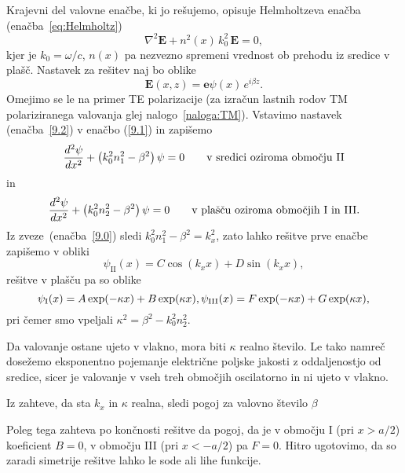 Krajevni del valovne enačbe, ki jo rešujemo, opisuje Helmholtzeva enačba 
(enačba~\ref{eq:Helmholtz})
\begin{equation}
\nabla^{2}\mathbf{E}+n^2(x)\,k_{0}^{2}\,\mathbf{E}=0,
\label{9.1}
\end{equation}
kjer je $k_{0}=\omega/c$, $n(x)$ pa nezvezno spremeni vrednost ob prehodu iz sredice v plašč. 
Nastavek za rešitev naj bo oblike 
\begin{equation}
{\mathbf E}(x,z)=\mathbf{e}\psi\left(x\right)\, e^{i\beta z}.
\label{9.2}
\end{equation}
Omejimo se le na primer TE polarizacije (za izračun lastnih rodov 
TM polariziranega
valovanja glej nalogo~\ref{naloga:TM}). Vstavimo nastavek (enačba~\ref{9.2}) v enačbo
(\ref{9.1}) in zapišemo
\begin{equation}
\frac{d^{2}{\bf \psi}}{dx^{2}}+\left(k_{0}^{2}n_1^{2}-\beta^{2}\right){\bf \psi}=0
\qquad \textrm{v sredici oziroma obmo\v cju II} 
\label{9.3a}
\end{equation}
in 
\begin{equation}
\frac{d^{2}{\bf \psi}}{dx^{2}}+\left(k_{0}^{2}n_2^{2}-\beta^{2}\right){\bf \psi}=0
\qquad \textrm{v plašču oziroma obmo\v cjih I in III.} 
\label{9.3b}
\end{equation}
Iz zveze~(enačba~\ref{9.0}) sledi $k_0^2n_1^2-\beta^2=k_x^2$, zato lahko rešitve prve enačbe
zapišemo v obliki
\begin{equation}
\psi_{\mathrm{II}}(x) = C \cos(k_x x)+D \sin(k_x x),
\end{equation}
rešitve v plašču pa so oblike
\begin{equation}
\psi_{\mathrm{I}}(x) = A \exp(-\kappa x)+B \exp(\kappa x),\\
\psi_{\mathrm{III}}(x) = F \exp(-\kappa x)+G \exp(\kappa x),
\end{equation}
pri čemer smo vpeljali $\kappa^2= \beta^2-k_0^2n_2^2$.

Da valovanje ostane ujeto v vlakno, mora biti $\kappa$ realno število.
Le tako namreč dosežemo eksponentno pojemanje električne poljske jakosti 
z oddaljenostjo od sredice,
sicer je valovanje v vseh treh območjih oscilatorno in ni ujeto v vlakno. 

Iz zahteve, da sta $k_x$ in $\kappa$ realna, sledi pogoj za valovno 
število $\beta$

Poleg tega zahteva po končnosti rešitve da pogoj, da je v območju I (pri $x>a/2$) koeficient $B=0$, 
v območju III (pri $x<-a/2$) pa $F=0$. Hitro ugotovimo, da so zaradi simetrije rešitve
lahko le sode ali lihe funkcije. 

